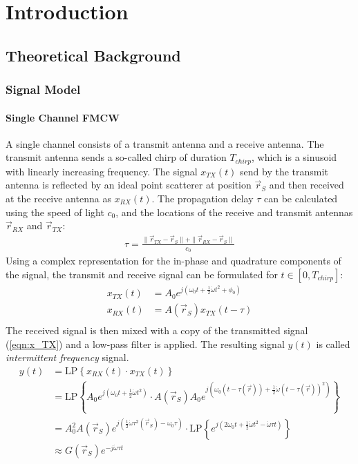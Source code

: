 \chapter{Introduction}
\section{Theoretical Background}
\subsection{Signal Model}
\subsubsection*{Single Channel FMCW}
A single channel consists of a transmit antenna and a receive antenna.
The transmit antenna sends a so-called chirp of duration $T_{chirp}$,
which is a sinusoid with linearly increasing frequency.
The signal $x_{TX}(t)$ send by the transmit antenna is reflected by an ideal point scatterer at position $\vec r_S$
and then received at the receive antenna as $x_{RX}(t)$.
The propagation delay $\tau$ can be calculated using the speed of light $c_0$,
and the locations of the receive and transmit antennas $\vec r_{RX}$ and $\vec r_{TX}$:
\begin{align}
    \tau = \frac{\| \vec r_{TX} - \vec r_S \|+\| \vec r_{RX} - \vec r_S \|}{c_0}
\end{align}
Using a complex representation for the in-phase and quadrature components of the signal,
the transmit and receive signal can be formulated for $t \in [0, T_{chirp}]$:
\begin{align}
    x_{TX}(t) & = A_0 e^{j(\omega_0t + \frac{1}{2}\dot \omega t^2 + \phi_0)} \label{eqn:x_TX} \\
    x_{RX}(t) & = A(\vec r_S) x_{TX}(t-\tau)                                 \label{eqn:x_RX} \\
\end{align}
The received signal is then mixed with a copy of the transmitted signal (\ref{eqn:x_TX}) and a low-pass filter is applied.
The resulting signal $y(t)$ is called \textit{intermittent frequency} signal.
\begin{align}
    y(t) & = \text{LP} \left\{ x_{RX}(t) \cdot x_{TX}(t) \right\}         \\
         & = \text{LP} \left\{
    A_0 e^{j(\omega_0t + \frac{1}{2}\dot \omega t^2) }
    \cdot A(\vec r_S) A_0 e^{j(\omega_0(t-\tau(\vec r)) + \frac{1}{2}\dot \omega (t-\tau(\vec r))^2) }
    \right\}                                                              \\
         & = A_0^2A(\vec r_S)
    e^{j(\frac{1}{2}\dot\omega\tau^2(\vec r_S)- \omega_0\tau)}
    \cdot  \text{LP} \left\{
    e^{j(2\omega_0 t + \frac{1}{2}\dot\omega t^2 - \dot\omega\tau t)}
    \right\}                                                \label{eqn:G} \\
         & \approx G(\vec r_S) e^{-j\dot\omega\tau t} \label{eqn:y_IF}
\end{align}
